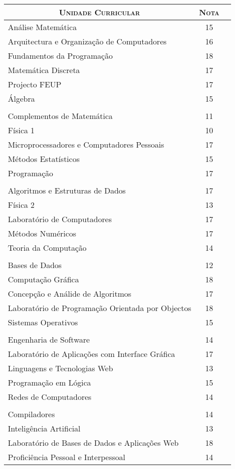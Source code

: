 \documentclass[a4paper,10pt]{article} %
\begin{document}
\begin{center}
\begin{tabular}{lcc}
\multicolumn{1}{c}{\textsc{Unidade Curricular}} & \textsc{Nota}\\ \hline
Análise Matemática & 15\\
Arquitectura e Organização de Computadores & 16\\
Fundamentos da Programação & 18\\
Matemática Discreta & 17\\
Projecto FEUP & 17\\
Álgebra & 15\\ \\
Complementos de Matemática & 11\\
Física 1 & 10\\
Microprocessadores e Computadores Pessoais & 17\\
Métodos Estatísticos & 15\\	
Programação	 & 17\\ \\
Algoritmos e Estruturas de Dados & 17\\
Física 2 & 13\\
Laboratório de Computadores & 17\\
Métodos Numéricos & 17\\
Teoria da Computação & 14\\	 \\
Bases de Dados & 12\\		
Computação Gráfica & 18\\
Concepção e Análide de Algoritmos & 17\\	
Laboratório de Programação Orientada por Objectos & 18\\
Sistemas Operativos & 15\\ \\
Engenharia de Software & 14\\
Laboratório de Aplicações com Interface Gráfica & 17\\			
Linguagens e Tecnologias Web & 13\\
Programação em Lógica & 15\\
Redes de Computadores & 14\\ \\
Compiladores & 14\\
Inteligência Artificial & 13\\
Laboratório de Bases de Dados e Aplicações Web & 18\\
Proficiência Pessoal e Interpessoal & 14\\

\end{tabular}
\end{center}
\end{document}
